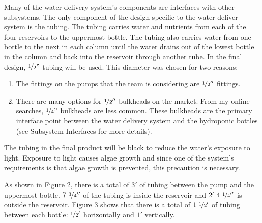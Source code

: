 \documentclass[12pt]{article}
\begin{document}
Many of the water delivery system's components are interfaces with other subsystems. The only
component of the design specific to the water deliver system is the tubing. The tubing carries water
and nutrients from each of the four reservoirs to the uppermost bottle. The tubing also carries
water from one bottle to the next in each column until the water drains out of the lowest bottle in
the column and back into the reservoir through another tube. In the final design, $\nicefrac{1}{2}"$
tubing will be used. This diameter was chosen for two reasons:

\begin{enumerate}

    \item The fittings on the pumps that the team is considering are $\nicefrac{1}{2}''$ fittings.

    \item There are many options for $\nicefrac{1}{2}''$ bulkheads on the market. From my online
        searches, $\nicefrac{1}{4}"$ bulkheads are less common. These bulkheads are the primary
        interface point between the water delivery system and the hydroponic bottles (see Subsystem
        Interfaces for more details).

\end{enumerate}


The tubing in the final product will be black to reduce the water's exposure to light. Exposure to
light causes algae growth \cite{doe-washington} and since one of the system's requirements is that
algae growth is prevented, this precaution is necessary.

As shown in Figure 2, there is a total of $3'$ of tubing between the pump and the uppermost bottle.
$7\ \nicefrac{3}{4}''$ of the tubing is inside the reservoir and $2'\ 4\ \nicefrac{1}{4}''$ is
outside the reservoir. Figure 3 shows that there is a total of $1\ \nicefrac{1}{2}'$ of tubing
between each bottle: $\nicefrac{1}{2}'$ horizontally and $1'$ vertically.
\end{document}

